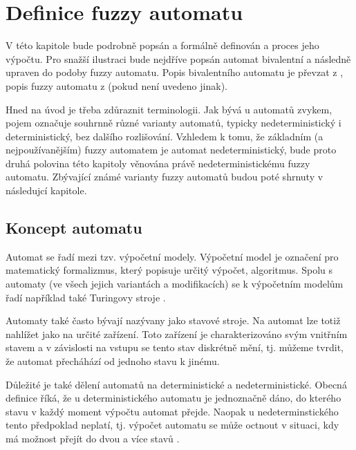\documentclass[a4paper,10pt]{article}
\begin{document}
\section{Definice fuzzy automatu}
V této kapitole bude podrobně popsán a formálně definován  a proces jeho výpočtu. Pro snažší ilustraci bude nejdříve popsán automat bivalentní a následně upraven do podoby fuzzy automatu. Popis bivalentního automatu je převzat z \cite{HopUl-IntrAutTheLangComp}, popis fuzzy automatu z \cite{GonGar-FuzzLangInfRanAccGuzzAutPumLemDetProc} (pokud není uvedeno jinak).

Hned na úvod je třeba zdůraznit terminologii. Jak bývá u automatů zvykem, pojem  označuje souhrnně různé varianty automatů, typicky nedeterministický i deterministický, bez dalšího rozlišování. Vzhledem k tomu, že základním (a nejpoužívanějším) fuzzy automatem je automat nedeterministický, bude proto druhá polovina této kapitoly věnována právě nedeterministickému fuzzy automatu. Zbývající známé varianty fuzzy automatů budou poté shrnuty v následujcí kapitole.


\subsection{Koncept automatu}
Automat se řadí mezi tzv. výpočetní modely. Výpočetní model je označení pro matematický formalizmus, který popisuje určitý výpočet, algoritmus. Spolu s automaty (ve všech jejich variantách a modifikacích) se k výpočetním modelům řadí například také Turingovy stroje \cite{MorMal-FuzzyAutLang}. 

Automaty také často bývají nazývany jako stavové stroje. Na automat lze totiž nahlížet jako na určité zařízení. Toto zařízení je charakterizováno svým vnitřním stavem a v závislosti na vstupu se tento stav diskrétně mění, tj. můžeme tvrdit, že automat přecháhází od jednoho stavu k jinému.

Důležité je také dělení automatů na deterministické a nedeterministické. Obecná definice říká, že u deterministického automatu je jednoznačně dáno, do kterého stavu v každý moment výpočtu automat přejde. Naopak u nedeterminstického tento předpoklad neplatí, tj. výpočet automatu se může octnout v situaci, kdy má možnost přejít do dvou a více stavů .
\end{document}
